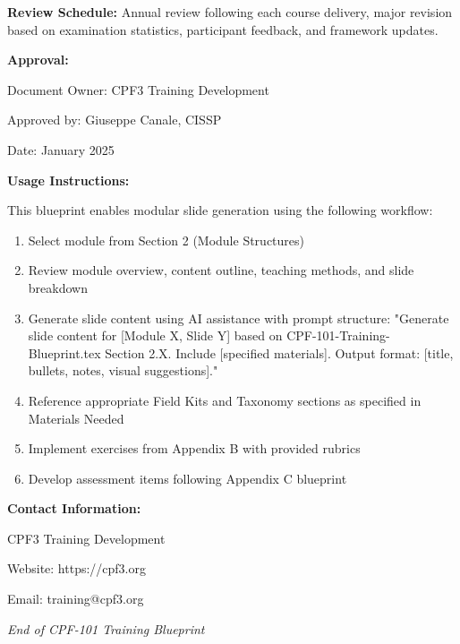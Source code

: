 \documentclass[11pt,a4paper]{article}
\begin{document}
\vspace{1em}

\textbf{Review Schedule:}
Annual review following each course delivery, major revision based on examination statistics, participant feedback, and framework updates.

\textbf{Approval:}

Document Owner: CPF3 Training Development

Approved by: Giuseppe Canale, CISSP

Date: January 2025

\textbf{Usage Instructions:}

This blueprint enables modular slide generation using the following workflow:

\begin{enumerate}
\item Select module from Section 2 (Module Structures)
\item Review module overview, content outline, teaching methods, and slide breakdown
\item Generate slide content using AI assistance with prompt structure: "Generate slide content for [Module X, Slide Y] based on CPF-101-Training-Blueprint.tex Section 2.X. Include [specified materials]. Output format: [title, bullets, notes, visual suggestions]."
\item Reference appropriate Field Kits and Taxonomy sections as specified in Materials Needed
\item Implement exercises from Appendix B with provided rubrics
\item Develop assessment items following Appendix C blueprint
\end{enumerate}

\textbf{Contact Information:}

CPF3 Training Development

Website: https://cpf3.org

Email: training@cpf3.org

\vspace{2em}

\begin{center}
\textit{End of CPF-101 Training Blueprint}
\end{center}
\end{document}
